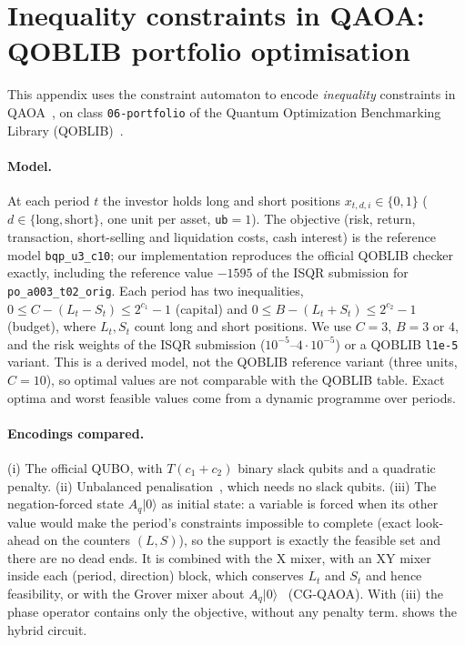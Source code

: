 \section{Inequality constraints in QAOA: QOBLIB portfolio optimisation}\label{sec:portfolio}
This appendix uses the constraint automaton to encode \emph{inequality} constraints in QAOA~\cite{farhi2014,hadfield2019}, on class \texttt{06-portfolio} of the Quantum Optimization Benchmarking Library (QOBLIB)~\cite{koch2026qoblib}.

\paragraph{Model.} At each period $t$ the investor holds long and short positions $x_{t,d,i}\in\{0,1\}$ ($d\in\{\mathrm{long},\mathrm{short}\}$, one unit per asset, \texttt{ub}$=1$). The objective (risk, return, transaction, short-selling and liquidation costs, cash interest) is the reference model \texttt{bqp\_u3\_c10}; our implementation reproduces the official QOBLIB checker exactly, including the reference value $-1595$ of the ISQR submission for \texttt{po\_a003\_t02\_orig}. Each period has two inequalities, $0\le C-(L_t-S_t)\le 2^{c_1}-1$ (capital) and $0\le B-(L_t+S_t)\le 2^{c_2}-1$ (budget), where $L_t,S_t$ count long and short positions. We use $C=3$, $B=3$ or $4$, and the risk weights of the ISQR submission ($10^{-5}$--$4\cdot10^{-5}$) or a QOBLIB \texttt{l1e-5} variant. This is a derived model, not the QOBLIB reference variant (three units, $C=10$), so optimal values are not comparable with the QOBLIB table. Exact optima and worst feasible values come from a dynamic programme over periods.

\paragraph{Encodings compared.} (i) The official QUBO, with $T(c_1+c_2)$ binary slack qubits and a quadratic penalty. (ii) Unbalanced penalisation~\cite{montanez2024unbalanced}, which needs no slack qubits. (iii) The negation-forced state $A_q|0\rangle$ as initial state: a variable is forced when its other value would make the period's constraints impossible to complete (exact look-ahead on the counters $(L,S)$), so the support is exactly the feasible set and there are no dead ends. It is combined with the X mixer, with an XY mixer~\cite{wang2020xy} inside each (period, direction) block, which conserves $L_t$ and $S_t$ and hence feasibility, or with the Grover mixer about $A_q|0\rangle$~\cite{bartschi2020gm} (CG-QAOA). With (iii) the phase operator contains only the objective, without any penalty term.  shows the hybrid circuit.

